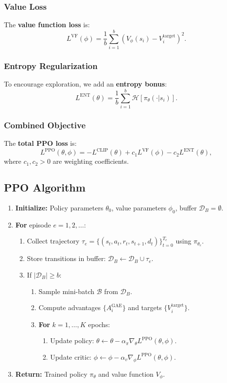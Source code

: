 \documentclass[11pt]{article}
\begin{document}
\subsubsection{Value Loss}
The \textbf{value function loss} is:
\[
L^{\text{VF}}(\phi) = \frac{1}{b} \sum_{i=1}^{b} \left( V_\phi(s_i) - V_i^{\text{target}} \right)^2.
\]

\subsubsection{Entropy Regularization}
To encourage exploration, we add an \textbf{entropy bonus}:
\[
L^{\text{ENT}}(\theta) = \frac{1}{b} \sum_{i=1}^{b} \mathcal{H}[\pi_\theta(\cdot|s_i)].
\]

\subsubsection{Combined Objective}
The \textbf{total PPO loss} is:
\[
L^{\text{PPO}}(\theta, \phi) = -L^{\text{CLIP}}(\theta) + c_1 L^{\text{VF}}(\phi) - c_2 L^{\text{ENT}}(\theta),
\]
where $c_1, c_2 > 0$ are weighting coefficients.


\subsection{PPO Algorithm}

\begin{enumerate}
  \item \textbf{Initialize:} Policy parameters $\theta_0$, value parameters $\phi_0$, buffer $\mathcal{D}_B = \emptyset$.

  \item \textbf{For} episode $e = 1, 2, \dots$:
  \begin{enumerate}
    \item Collect trajectory $\tau_e = \{(s_t, a_t, r_t, s_{t+1}, d_t)\}_{t=0}^{T_e}$ using $\pi_{\theta_e}$.
    \item Store transitions in buffer: $\mathcal{D}_B \leftarrow \mathcal{D}_B \cup \tau_e$.
    \item If $|\mathcal{D}_B| \ge b$:
    \begin{enumerate}
      \item Sample mini-batch $\mathcal{B}$ from $\mathcal{D}_B$.
      \item Compute advantages $\{A_i^{\text{GAE}}\}$ and targets $\{V_i^{\text{target}}\}$.
      \item \textbf{For} $k = 1, \dots, K$ epochs:
      \begin{enumerate}
        \item Update policy: $\theta \leftarrow \theta - \alpha_\pi \nabla_\theta L^{\text{PPO}}(\theta, \phi)$.
        \item Update critic: $\phi \leftarrow \phi - \alpha_v \nabla_\phi L^{\text{PPO}}(\theta, \phi)$.
      \end{enumerate}
    \end{enumerate}
  \end{enumerate}

  \item \textbf{Return:} Trained policy $\pi_\theta$ and value function $V_\phi$.
\end{enumerate}
\end{document}
